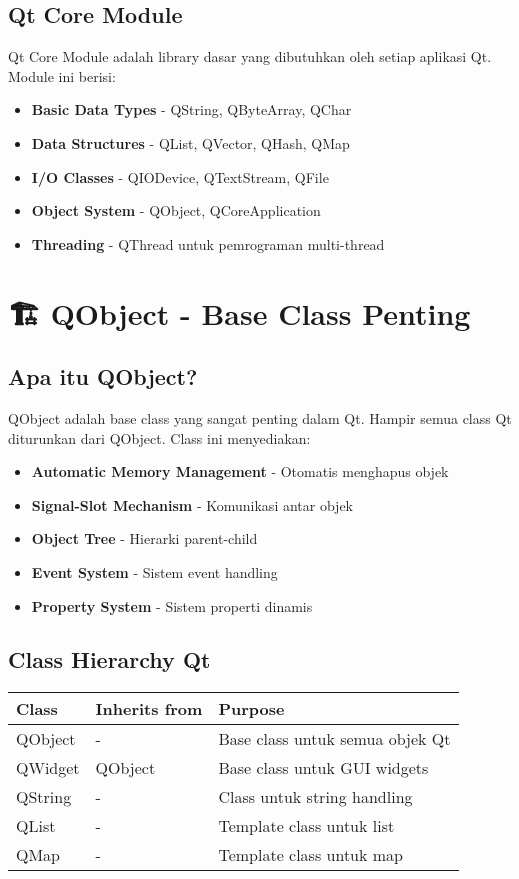 \subsection{Qt Core Module}

Qt Core Module adalah library dasar yang dibutuhkan oleh setiap aplikasi Qt. Module ini berisi:

\begin{itemize}
\item \textbf{Basic Data Types} - QString, QByteArray, QChar
\item \textbf{Data Structures} - QList, QVector, QHash, QMap
\item \textbf{I/O Classes} - QIODevice, QTextStream, QFile
\item \textbf{Object System} - QObject, QCoreApplication
\item \textbf{Threading} - QThread untuk pemrograman multi-thread
\end{itemize}

\section{🏗️ QObject - Base Class Penting}

\subsection{Apa itu QObject?}

QObject adalah base class yang sangat penting dalam Qt. Hampir semua class Qt diturunkan dari QObject. Class ini menyediakan:

\begin{itemize}
\item \textbf{Automatic Memory Management} - Otomatis menghapus objek
\item \textbf{Signal-Slot Mechanism} - Komunikasi antar objek
\item \textbf{Object Tree} - Hierarki parent-child
\item \textbf{Event System} - Sistem event handling
\item \textbf{Property System} - Sistem properti dinamis
\end{itemize}

\subsection{Class Hierarchy Qt}

\begin{center}
\begin{tabular}{|l|l|l|}
\hline
\textbf{Class} & \textbf{Inherits from} & \textbf{Purpose} \\
\hline
QObject & - & Base class untuk semua objek Qt \\
\hline
QWidget & QObject & Base class untuk GUI widgets \\
\hline
QString & - & Class untuk string handling \\
\hline
QList & - & Template class untuk list \\
\hline
QMap & - & Template class untuk map \\
\hline
\end{tabular}
\end{center}

